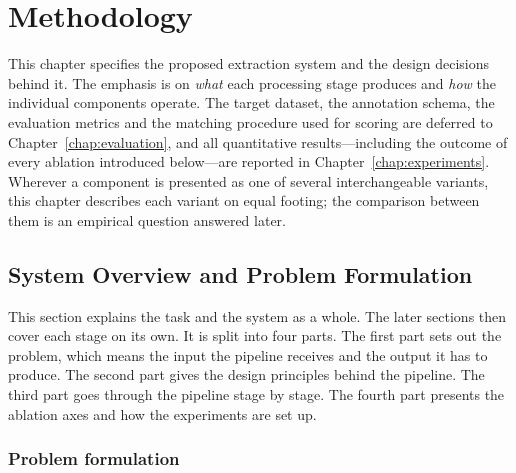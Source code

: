 
%
%


\chapter{Methodology}\label{chap:methodology}
\DeclareRobustCommand{\mcode}[1]{\begingroup\ttfamily\detokenize{#1}\endgroup}
This chapter specifies the proposed extraction system and the design
decisions behind it. The emphasis is on \emph{what} each processing
stage produces and \emph{how} the individual components operate. The
target dataset, the annotation schema, the evaluation metrics and the
matching procedure used for scoring are deferred to
Chapter~\ref{chap:evaluation}, and all quantitative results---including
the outcome of every ablation introduced below---are reported in
Chapter~\ref{chap:experiments}. Wherever a component is presented as one
of several interchangeable variants, this chapter describes each variant
on equal footing; the comparison between them is an empirical question
answered later.

\section{System Overview and Problem Formulation}\label{sec:overview}

This section explains the task and the system as a whole. The later sections then cover each stage on its own. It is split into four parts. The first part sets out the problem, which means the input the pipeline receives and the output it has to produce. The second part gives the design principles behind the pipeline. The third part goes through the pipeline stage by stage. The fourth part presents the ablation axes and how the experiments are set up.
\subsection{Problem formulation}\label{sec:overview-problem}

